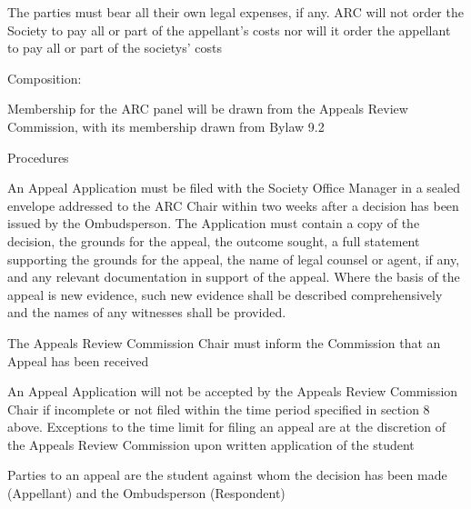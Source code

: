 \begin{longenum}[ label*=\arabic*., align=left]
\begin{longenum}[ label*=\arabic*., align=left]
\begin{longenum}[ label*=\arabic*., align=left]
      \end{longenum}
      \item The parties must bear all their own legal expenses, if any. ARC will not order the Society to pay all or part of the appellant's costs nor will it order the appellant to pay all or part of the societys' costs
      \item Composition: 
                  
Membership  for  the  ARC  panel  will  be  drawn  from  the  Appeals  Review  Commission,  with  its membership drawn from Bylaw 9.2
      \item Procedures
      
An  Appeal Application  must  be  filed  with  the  Society  Office  Manager  in  a  sealed  envelope addressed  to  the  ARC  Chair  within  two  weeks  after  a  decision  has  been  issued  by  the Ombudsperson. The Application must contain a copy of the decision, the grounds for the appeal, the  outcome  sought,  a  full  statement  supporting  the  grounds  for  the  appeal,  the  name  of  legal counsel  or  agent,  if  any,  and  any  relevant  documentation  in  support  of  the  appeal.  Where  the basis of the appeal is new evidence, such new evidence shall be described comprehensively and the names of any witnesses shall be provided.
    \begin{longenum}[ label*=\arabic*., align=left]
			\item The Appeals Review Commission Chair must inform the Commission that an Appeal has been received
      \end{longenum}
\item An Appeal Application will not be accepted by the Appeals Review Commission Chair if incomplete or not filed within the time period specified in section 8 above. Exceptions to the time limit for filing an appeal are at the discretion of the Appeals Review Commission upon written application of the student
\item Parties  to  an  appeal  are  the  student  against  whom  the  decision  has  been  made  (Appellant) and the Ombudsperson (Respondent)   


\end{longenum}
\end{longenum}
